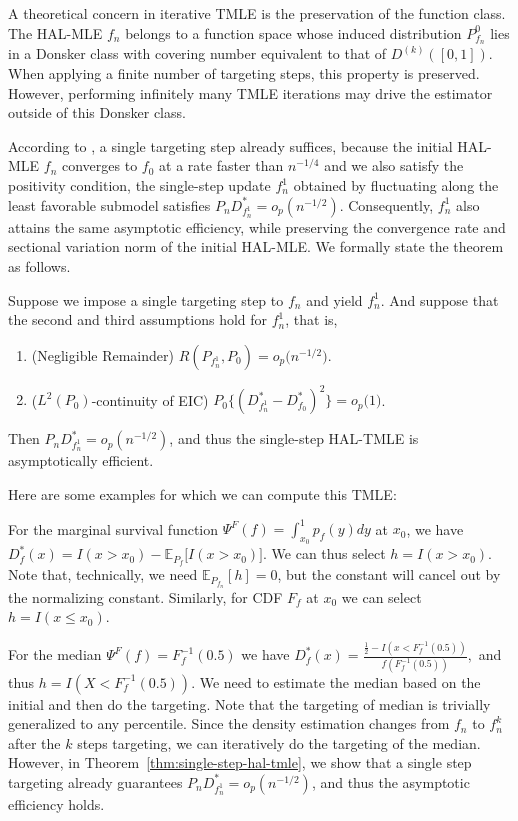 A theoretical concern in iterative TMLE is the preservation of the function class.
The HAL-MLE $f_n$ belongs to a function space whose induced distribution $P_{f_n}^0$ lies in a 
Donsker class with covering number equivalent to that of $D^{(k)}([0,1])$. When applying a finite number of targeting steps, this property is preserved. However, performing infinitely many TMLE iterations may drive the estimator outside of this Donsker class.

According to \citet{van2017generally}, a single targeting step already suffices, because the initial HAL-MLE $f_n$ converges to $f_0$ at a rate faster than $n^{-1/4}$ and we also satisfy the positivity condition, the single-step update $f_n^1$ obtained by fluctuating along the least favorable submodel satisfies
$
P_n D^*_{f_n^1} = o_p(n^{-1/2}).
$
Consequently, $f_n^1$ also attains the same asymptotic efficiency, while preserving the convergence rate and sectional variation norm of the initial HAL-MLE. We formally state the theorem as follows.

\begin{theorem}  \label{thm:single-step-hal-tmle}
Suppose we impose a single targeting step to $f_n$ and yield $f_n^1$. And suppose that the second and third assumptions hold for $f_n^1$, that is,
\begin{enumerate}
\item (Negligible Remainder) \(R(P_{f_n^1},P_0)=o_p\bigl(n^{-1/2}\bigr)\).
\item (\(L^2(P_0)\)-continuity of EIC) \(P_0\{(D^*_{f_n^1}-D^*_{f_0})^2\}
      = o_p\bigl(1\bigr)\).
\end{enumerate}
Then $P_n D^*_{f_n^1} = o_p(n^{-1/2})$, and thus the single-step HAL-TMLE is asymptotically efficient.
\end{theorem}

Here are some examples for which we can compute this TMLE:

\begin{example}
For the marginal survival function $\Psi^F(f)=\int_{x_0}^1 p_f(y)dy$ at $x_0$, we have \(D^*_f(x) = I(x > x_0) - \mathbb{E}_{P_{f}}\bigl[I(x > x_0)\bigr].\) We can thus select $h = I(x > x_0)$. Note that, technically, we need $\mathbb{E}_{P_{f_n}}[h] = 0$, but the constant will cancel out by the normalizing constant. Similarly, for CDF $F_f$ at $x_0$ we can select $h=I(x\leq x_0)$.
\end{example}

\begin{example}[Median]
For the median $\Psi^F(f)=F_f^{-1}(0.5)$ we have 
\(D^*_f(x) = \frac{\frac12 - I(x < F_f^{-1}(0.5))}{f(F_f^{-1}(0.5)) },\) and thus $h = I(X< F_f^{-1}(0.5))$. We need to estimate the median based on the initial and then do the targeting. Note that the targeting of median is trivially generalized to any percentile. Since the density estimation changes from $f_n$ to $f_n^k$ after the $k$ steps targeting, we can iteratively do the targeting of the median. However, in Theorem~\ref{thm:single-step-hal-tmle}, we show that a single step targeting already guarantees $P_n D^*_{f_n^1} = o_p(n^{-1/2})$, and thus the asymptotic efficiency holds.
\end{example}

